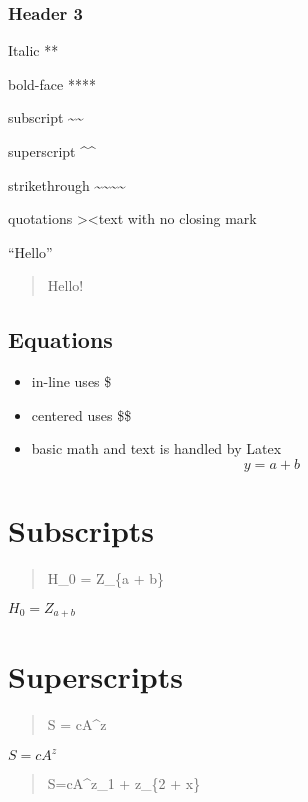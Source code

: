 \documentclass[
]{article}
\providecommand{\tightlist}{%
  \setlength{\itemsep}{0pt}\setlength{\parskip}{0pt}}
\begin{document}
\hypertarget{header-3}{%
\subsubsection{Header 3}\label{header-3}}

Italic **

bold-face ****

subscript \textasciitilde\textasciitilde{}

superscript \^{}\^{}

strikethrough
\textasciitilde\textasciitilde\textasciitilde\textasciitilde{}

quotations \textgreater\textless text with no closing mark

``Hello''

\begin{quote}
Hello!
\end{quote}

\hypertarget{equations}{%
\subsection{Equations}\label{equations}}

\begin{itemize}
\tightlist
\item
  in-line uses \$
\item
  centered uses \$\$
\item
  basic math and text is handled by Latex \[y = a + b\]
\end{itemize}

\hypertarget{subscripts}{%
\section{Subscripts}\label{subscripts}}

\begin{quote}
H\_0 = Z\_\{a + b\}
\end{quote}

\(H_0 = Z_{a + b}\)

\hypertarget{superscripts}{%
\section{Superscripts}\label{superscripts}}

\begin{quote}
S = cA\^{}z
\end{quote}

\(S = cA^z\)

\begin{quote}
S=cA\^{}z\_1 + z\_\{2 + x\}
\end{quote}
\end{document}

